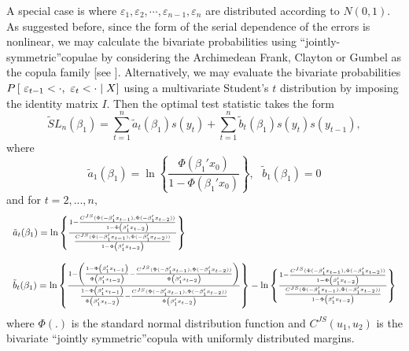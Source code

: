 \documentclass[harvard,11pt]{article}
\begin{document}
 A special case is where $\varepsilon_1,\varepsilon_2,\cdots,\varepsilon_{n-1},\varepsilon_n$ are distributed according to $N(0,1)$. As suggested before, since the form of the serial dependence of the errors is nonlinear, we may calculate the bivariate probabilities using \textquotedblleft jointly-symmetric\textquotedblright copulae by considering the Archimedean Frank, Clayton or Gumbel as the copula family [see \citet{joe2014dependence}]. Alternatively, we may evaluate the bivariate probabilities $P\left[ \text{ }\varepsilon_{t-1}<\cdot ,\-
\text{ }\varepsilon_{t}<\cdot \mid X\right]$ using a multivariate Student's $t$ distribution by imposing the identity matrix $I$.
 Then the optimal test statistic takes the form 
\begin{equation*}
\tilde{S}L_{n}(\beta _{1})=\sum\limits_{t=1}^{n}\tilde{a}_{t}(\beta _{1})%
s(y_{t})+\sum\limits_{t=1}^{n}\tilde{b}_{t}(\beta _{1})%
s(y_{t})s(y_{t-1}),
\end{equation*}%
where%
\begin{equation*}
\tilde{a}_{1}(\beta _{1})=\ln \left\{ \frac{\Phi(\beta_1'x_0) }{1-\Phi(\beta_1'x_0)}\right\} ,\text{ }\tilde{b}_{1}(\beta _{1})=0
\end{equation*}%
and for $t=2,...,n,$%
\begin{equation*}
\begin{tabular}{l}
$\tilde{a}_{t}(\beta _{1})=\ln \left\{ \frac{1-\frac{C^{JS}(\Phi(-\beta_1'x_{t-1}),\Phi(-\beta_1'x_{t-2})) }{1-\Phi\left(\beta_1'x_{t-2}\right)}}{\frac{C^{JS}(\Phi(-\beta_1'x_{t-1}),\Phi(-\beta_1'x_{t-2})) }{1-\Phi\left(\beta_1'x_{t-2}\right)}}\right\} $ \\ 
\\ 
$\tilde{b}_{t}(\beta _{1})=\ln \left\{ \frac{1-\left( \frac{1-\Phi\left(\beta_1'x_{t-1}\right) }{\Phi\left(\beta_1'x_{t-2}\right) }-\frac{C^{JS}(\Phi(-\beta_1'x_{t-1}),\Phi(-\beta_1'x_{t-2})) }{\Phi\left(\beta_1'x_{t-2}\right) }\right) }{\frac{1-\Phi\left(\beta_1'x_{t-1}\right)}{\Phi\left(\beta_1'x_{t-2}\right) }-\frac{C^{JS}(\Phi(-\beta_1'x_{t-1}),\Phi(-\beta_1'x_{t-2})) }{\Phi\left(\beta_1'x_{t-2}\right)}}\right\} -\ln \left\{ \frac{1-\frac{C^{JS}(\Phi(-\beta_1'x_{t-1}),\Phi(-\beta_1'x_{t-2})) }{1-\Phi\left(\beta_1'x_{t-2}\right) }}{\frac{C^{JS}(\Phi(-\beta_1'x_{t-1}),\Phi(-\beta_1'x_{t-2}))}{1-\Phi\left(\beta_1'x_{t-2}\right)}}\right\} $%
\end{tabular}%
\end{equation*}%
where $\Phi(.)$ is the standard normal distribution function and $C^{JS}(u_1,u_2)$ is the bivariate \textquotedblleft jointly symmetric\textquotedblright copula with uniformly distributed margins.
\end{document}
